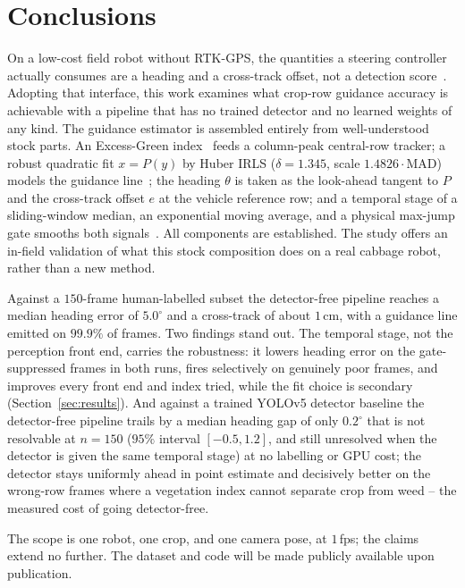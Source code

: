 
\section{Conclusions}
\label{sec:conclusion}

On a low-cost field robot without RTK-GPS, the quantities a steering controller actually
consumes are a heading and a cross-track offset, not a detection
score~\cite{cth3,sogaard}. Adopting that interface, this work examines what crop-row
guidance accuracy is achievable with a pipeline that has no trained detector and
no learned weights of any kind. The guidance estimator is assembled entirely from
well-understood stock parts. An Excess-Green index~\cite{woebbecke1995,meyer2008} feeds a
column-peak central-row tracker; a robust quadratic fit $x=P(y)$ by Huber IRLS
($\delta=1.345$, scale $1.4826\cdot\mathrm{MAD}$) models the guidance
line~\cite{huber1964,marchant1995}; the heading $\theta$ is taken as the look-ahead tangent
to $P$ and the cross-track offset $e$ at the vehicle reference row; and a temporal stage of
a sliding-window median, an exponential moving average, and a physical max-jump gate
smooths both signals~\cite{kalman1960}. All components are established. The study offers
an in-field validation of what this stock composition does on a real cabbage robot,
rather than a new method.

Against a $150$-frame human-labelled subset the detector-free pipeline reaches a median heading error of
$5.0^{\circ}$ and a cross-track of about $1$\,cm, with a guidance line emitted on $99.9\%$ of frames. Two findings
stand out. The temporal stage, not the perception front end, carries the robustness: it lowers heading
error on the gate-suppressed frames in both runs, fires selectively on genuinely poor frames, and improves
every front end and index tried, while the fit choice is secondary (Section~\ref{sec:results}). And against
a trained YOLOv5 detector baseline the detector-free pipeline trails by a median heading gap of only
$0.2^\circ$ that is not resolvable at $n=150$ ($95\%$ interval $[-0.5,1.2]$, and still unresolved when the
detector is given the same temporal stage) at no labelling or GPU cost; the detector stays uniformly ahead in
point estimate and decisively better on the wrong-row frames where a vegetation index cannot separate crop
from weed -- the measured cost of going detector-free.

The scope is one robot, one crop, and one camera pose, at $1$\,fps; the claims extend no further. The dataset
and code will be made publicly available upon publication.

